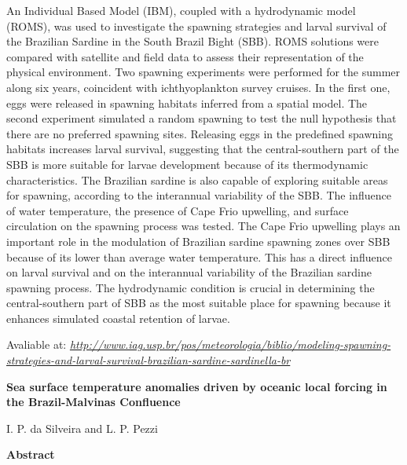 \noindent An Individual Based Model (IBM), coupled with a hydrodynamic model (ROMS), was used to investigate the spawning strategies and larval survival of the Brazilian Sardine in the South Brazil Bight (SBB). 
          ROMS solutions were compared with satellite and field data to assess their representation of the physical environment. Two spawning experiments were performed for the summer along six years, 
          coincident with ichthyoplankton survey cruises. In the first one, eggs were released in spawning habitats inferred from a spatial model. The second experiment simulated a random spawning to test
          the null hypothesis that there are no preferred spawning sites. Releasing eggs in the predefined spawning habitats increases larval survival, suggesting that the central-southern part of the SBB is
          more suitable for larvae development because of its thermodynamic characteristics. The Brazilian sardine is also capable of exploring suitable areas for spawning, according to the interannual
          variability of the SBB. The influence of water temperature, the presence of Cape Frio upwelling, and surface circulation on the spawning process was tested. The Cape Frio upwelling plays an important 
          role in the modulation of Brazilian sardine spawning zones over SBB because of its lower than average water temperature. This has a direct influence on larval survival and on the interannual variability
          of the Brazilian sardine spawning process. The hydrodynamic condition is crucial in determining the central-southern part of SBB as the most suitable place for spawning because it enhances simulated 
          coastal retention of larvae.
\bigskip

\noindent {}
\bigskip

\noindent Avaliable at: \textcolor{bleu_cite}{\href{http://www.iag.usp.br/pos/meteorologia/biblio/modeling-spawning-strategies-and-larval-survival-brazilian-sardine-sardinella-br}{\textit{http://www.iag.usp.br/pos/meteorologia/biblio/modeling-spawning-strategies-and-larval-survival-brazilian-sardine-sardinella-br}}}


\bigskip

\newpage
\bigskip

\noindent \begin{center} \textbf{Sea surface temperature anomalies driven by oceanic local forcing in the Brazil-Malvinas Confluence}
\bigskip

\noindent I. P. da Silveira and L. P. Pezzi
\bigskip

\noindent \textbf{Abstract}\end{center}
\bigskip

